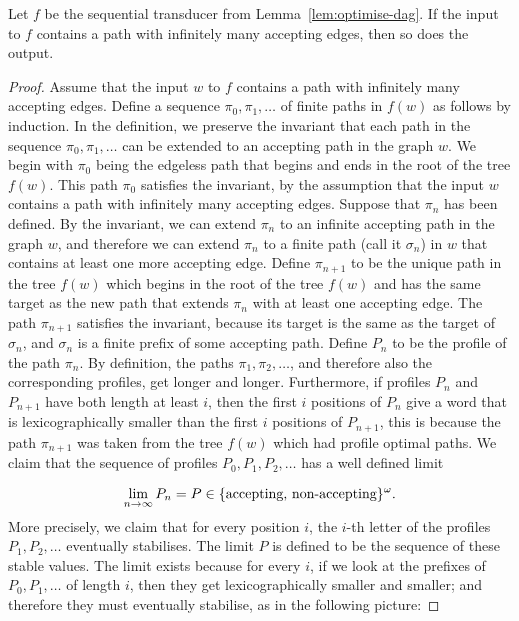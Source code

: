  
\begin{lemma}\label{lem:optimal-is-accepting}
Let $f$ be the sequential transducer from Lemma~\ref{lem:optimise-dag}. If the input to $f$ contains a path with infinitely many accepting edges, then so does the output.
\end{lemma}
\begin{proof}
Assume that the input $w$ to $f$ contains a path with infinitely many accepting edges. Define a sequence $\pi_0,\pi_1,\ldots$ of finite paths in $f(w)$ as follows by induction. In the definition, we  preserve the invariant that each  path in the sequence $\pi_0,\pi_1,\ldots$ can be extended to  an accepting path in the graph $w$. We begin with $\pi_0$ being the edgeless path that begins and ends in the root of the tree $f(w)$.  This path $\pi_0$ satisfies the invariant, by the assumption that the input $w$ contains a path with infinitely many accepting edges. Suppose that $\pi_n$ has been defined. By the invariant, we can extend $\pi_n$ to an infinite accepting path in the graph $w$, and therefore we can extend $\pi_n$ to a finite path (call it $\sigma_n$) in $w$ that contains at least one more accepting edge.  Define $\pi_{n+1}$ to be the unique path in the tree $f(w)$ which begins in the root of the tree $f(w)$ and has the same  target as the new path that extends $\pi_n$ with  at least one accepting edge.
The path $\pi_{n+1}$ satisfies the invariant, because its target is the same as the target of $\sigma_n$, and $\sigma_n$ is a finite prefix of some accepting path.
Define $P_n$ to be the profile of the path $\pi_n$. By definition, the paths $\pi_1,\pi_2,\ldots$, and therefore also the corresponding profiles, get longer and longer. Furthermore, if  profiles $P_n$ and $P_{n+1}$ have both length at least $i$, then the first $i$ positions of $P_n$ give a word that is lexicographically smaller than the first $i$ positions of $P_{n+1}$, this is because the path $\pi_{n+1}$ was taken from the tree $f(w)$ which had profile optimal paths.
 We claim that the sequence of profiles $P_0,P_1,P_2,\ldots$ has a well defined limit

$$\lim_{n \to \infty} P_n  = P \in \{\text{accepting, non-accepting}\}^\omega.$$
More precisely, we claim that for every position $i$, the $i$-th letter of the profiles $P_1,P_2,\ldots$ eventually stabilises. The limit $P$ is defined to  be the sequence of these stable values. The limit exists because for every $i$, if we look at the prefixes of $P_0,P_1,\ldots$ of length $i$, then they get lexicographically smaller and smaller; and therefore they must eventually stabilise, as in the following picture:


\end{proof}
